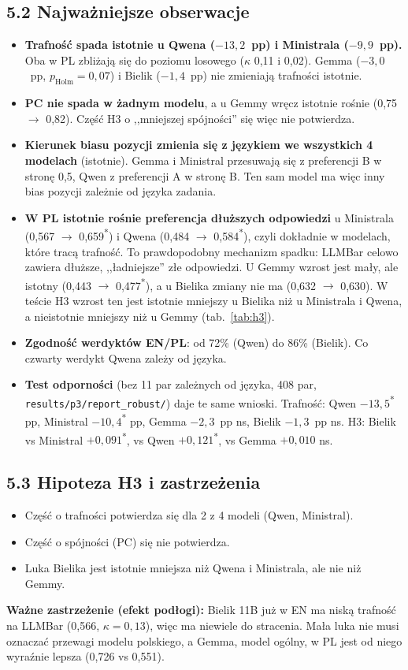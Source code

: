\documentclass[10pt,a4paper]{article}
\newcommand{\s}{\textsuperscript{*}}
\begin{document}
\subsection*{5.2 Najważniejsze obserwacje}
\begin{itemize}
  \item \textbf{Trafność spada istotnie u Qwena ($-13{,}2$~pp) i Ministrala ($-9{,}9$~pp).} Oba w PL zbliżają się do poziomu losowego ($\kappa$ 0,11 i 0,02). Gemma ($-3{,}0$~pp, $p_{\text{Holm}}=0{,}07$) i Bielik ($-1{,}4$~pp) nie zmieniają trafności istotnie.
  \item \textbf{PC nie spada w żadnym modelu}, a u Gemmy wręcz istotnie rośnie (0,75 $\rightarrow$ 0,82). Część H3 o ,,mniejszej spójności'' się więc nie potwierdza.
  \item \textbf{Kierunek biasu pozycji zmienia się z językiem we wszystkich 4 modelach} (istotnie). Gemma i Ministral przesuwają się z preferencji B w stronę 0,5, Qwen z preferencji A w stronę B. Ten sam model ma więc inny bias pozycji zależnie od języka zadania.
  \item \textbf{W PL istotnie rośnie preferencja dłuższych odpowiedzi} u Ministrala (0,567 $\rightarrow$ 0,659\s) i Qwena (0,484 $\rightarrow$ 0,584\s), czyli dokładnie w modelach, które tracą trafność. To prawdopodobny mechanizm spadku: LLMBar celowo zawiera dłuższe, ,,ładniejsze'' złe odpowiedzi. U Gemmy wzrost jest mały, ale istotny (0,443 $\rightarrow$ 0,477\s), a u Bielika zmiany nie ma (0,632 $\rightarrow$ 0,630). W teście H3 wzrost ten jest istotnie mniejszy u Bielika niż u Ministrala i Qwena, a nieistotnie mniejszy niż u Gemmy (tab.~\ref{tab:h3}).
  \item \textbf{Zgodność werdyktów EN/PL}: od 72\% (Qwen) do 86\% (Bielik). Co czwarty werdykt Qwena zależy od języka.
  \item \textbf{Test odporności} (bez 11 par zależnych od języka, 408 par, \texttt{results/p3/report\_robust/}) daje te same wnioski. Trafność: Qwen $-13{,}5$\s{} pp, Ministral $-10{,}4$\s{} pp, Gemma $-2{,}3$~pp ns, Bielik $-1{,}3$~pp ns. H3: Bielik vs Ministral $+0{,}091$\s, vs Qwen $+0{,}121$\s, vs Gemma $+0{,}010$ ns.
\end{itemize}

\subsection*{5.3 Hipoteza H3 i zastrzeżenia}
\begin{itemize}
  \item Część o trafności potwierdza się dla 2 z 4 modeli (Qwen, Ministral).
  \item Część o spójności (PC) się nie potwierdza.
  \item Luka Bielika jest istotnie mniejsza niż Qwena i Ministrala, ale nie niż Gemmy.
\end{itemize}
\textbf{Ważne zastrzeżenie (efekt podłogi):} Bielik 11B już w EN ma niską trafność na LLMBar (0,566, $\kappa=0{,}13$), więc ma niewiele do stracenia. Mała luka nie musi oznaczać przewagi modelu polskiego, a Gemma, model ogólny, w PL jest od niego wyraźnie lepsza (0,726 vs 0,551).
\end{document}
